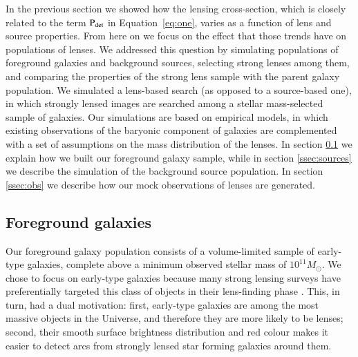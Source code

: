 \documentclass{aa}
\def\pdet{{\rm P}_\mathrm{det}}
\def\Sref#1{Section~\ref{#1}\xspace}
\def\Eref#1{Equation~\ref{#1}\xspace}
\begin{document}
In the previous section we showed how the lensing cross-section, which is closely related to the term $\pdet$ in \Eref{eq:one}, varies as a function of lens and source properties.
From here on we focus on the effect that those trends have on populations of lenses.
We addressed this question by simulating populations of foreground galaxies and background sources, selecting strong lenses among them, and comparing the properties of the strong lens sample with the parent galaxy population.
We simulated a lens-based search (as opposed to a source-based one), in which strongly lensed images are searched among a stellar mass-selected sample of galaxies.
Our simulations are based on empirical models, in which existing observations of the baryonic component of galaxies are complemented with a set of assumptions on the mass distribution of the lenses.
In section \ref{ssec:lenses} we explain how we built our foreground galaxy sample,
while in section \ref{ssec:sources} we describe the simulation of the background source population.
In section \ref{ssec:obs} we describe how our mock observations of lenses are generated.



\subsection{Foreground galaxies}\label{ssec:lenses}

Our foreground galaxy population consists of a volume-limited sample of early-type galaxies, complete above a minimum observed stellar mass of $10^{11}M_\odot$.
We chose to focus on early-type galaxies because many strong lensing surveys have preferentially targeted this class of objects in their lens-finding phase \citep[e.g.][]{Bol++06,Gav++12,Son++18a}.
This, in turn, had a dual motivation:
first, early-type galaxies are among the most massive objects in the Universe, and therefore they are more likely to be lenses;
second, their smooth surface brightness distribution and red colour makes it easier to detect arcs from strongly lensed star forming galaxies around them.
\end{document}
